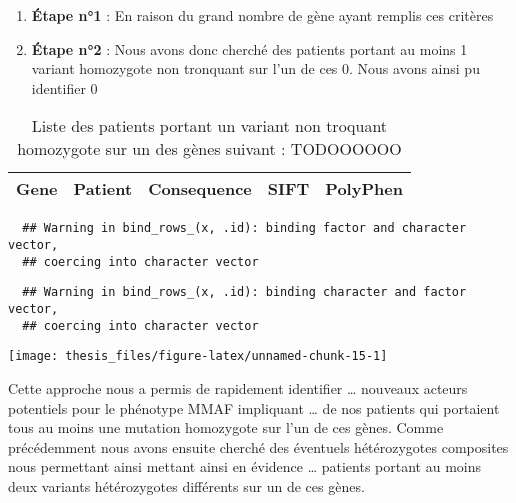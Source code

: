 \documentclass[12pt,twoside]{reedthesis}
\providecommand{\tightlist}{%
  \setlength{\itemsep}{0pt}\setlength{\parskip}{0pt}}
\theoremstyle{definition}
\theoremstyle{definition}
\theoremstyle{remark}
\begin{document}
  \begin{enumerate}
  \def\labelenumi{\arabic{enumi}.}
  \tightlist
  \item
    \textbf{Étape n°1} : En raison du grand nombre de gène ayant remplis
    ces critères\\
  \item
    \textbf{Étape n°2} : Nous avons donc cherché des patients portant au
    moins 1 variant homozygote non tronquant sur l'un de ces 0. Nous avons
    ainsi pu identifier 0
  \end{enumerate}
  
  \newpage
  
  \begin{longtable}[t]{lllll}
  \caption{\label{tab:tabgrp4moderate}Liste des patients portant un variant non troquant homozygote sur un des gènes suivant : TODOOOOOO}\\
  \toprule
  Gene & Patient & Consequence & SIFT & PolyPhen\\
  
  
  \bottomrule
  \end{longtable}
  
  \begin{verbatim}
  ## Warning in bind_rows_(x, .id): binding factor and character vector,
  ## coercing into character vector
  \end{verbatim}
  
  \begin{verbatim}
  ## Warning in bind_rows_(x, .id): binding character and factor vector,
  ## coercing into character vector
  \end{verbatim}
  
  \begin{center}\texttt{[image: thesis\_files/figure-latex/unnamed-chunk-15-1]} \end{center}
  
  \newpage 
  
  Cette approche nous a permis de rapidement identifier \ldots{} nouveaux
  acteurs potentiels pour le phénotype MMAF impliquant \ldots{} de nos
  patients qui portaient tous au moins une mutation homozygote sur l'un de
  ces gènes. Comme précédemment nous avons ensuite cherché des éventuels
  hétérozygotes composites nous permettant ainsi mettant ainsi en évidence
  \ldots{} patients portant au moins deux variants hétérozygotes
  différents sur un de ces gènes.
  
\end{document}
